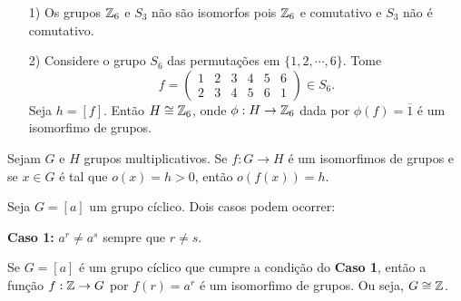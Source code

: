 \documentclass{beamer}
\begin{document}
    \begin{frame}
        \begin{exemplos}
            \vspace{.3cm}
            \begin{enumerate}
                \item[1)] Os grupos $\mathbb{Z}_6$ e $S_3$ não são isomorfos pois $\mathbb{Z}_6$ e comutativo e $S_3$ não é comutativo.

                \vspace{.3cm}

                \item[2)] Considere o grupo $S_6$ das permutações em $\{1, 2, \cdots, 6\}$. Tome
                \[
                    f = \begin{pmatrix}
                        1 & 2 & 3 & 4 & 5 & 6\\
                        2 & 3 & 4 & 5 & 6 & 1
                    \end{pmatrix} \in S_6.
                \]
                Seja $h = [f]$. Então $H \cong \mathbb{Z}_6$, onde $\phi : H \to \mathbb{Z}_6$ dada por $\phi(f) = \overline{1}$ é um isomorfimo de grupos.
                
                \vspace{.3cm}

            \end{enumerate}
        \end{exemplos}
    \end{frame}

    \begin{frame}
        \begin{proposicao}
            Sejam $G$ e $H$ grupos multiplicativos. Se $f : G \to H$ é um isomorfimos de grupos e se $x \in G$ é tal que $o(x) = h > 0$, então $o(f(x)) = h$.
        \end{proposicao}
    \end{frame}

    \begin{frame}
        Seja $G = [a]$ um grupo cíclico. Dois casos podem ocorrer:

        \textbf{Caso 1:} $a^r \ne a^s$ sempre que $r \ne s$.
    \end{frame}

    \begin{frame}
        \begin{proposicao}
            Se $G = [a]$ é um grupo cíclico que cumpre a condição do \textbf{Caso 1}, então a função $f : \mathbb{Z} \to G$ por $f(r) = a^r$ é um isomorfimo de grupos. Ou seja, $G \cong \mathbb{Z}$.
        \end{proposicao}
    \end{frame}
\end{document}
